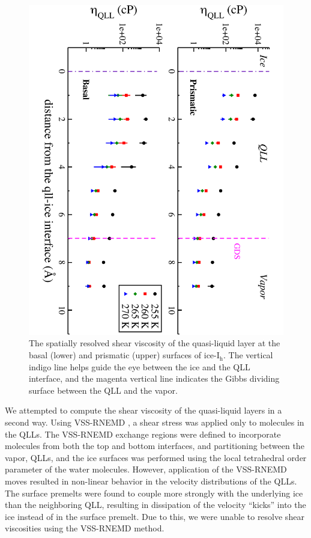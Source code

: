 \begin{figure}
\includegraphics[width=\linewidth]{Figures/qllEta}
\caption{\label{fig:qllEta}The spatially resolved shear viscosity of
  the quasi-liquid layer at the basal (lower) and prismatic (upper)
  surfaces of ice-I$_\mathrm{h}$. The vertical indigo line helps guide
  the eye between the ice and the QLL interface, and the magenta
  vertical line indicates the Gibbs dividing surface between the QLL
  and the vapor.}
\end{figure} 









We attempted to compute the shear viscosity of the quasi-liquid layers
in a second way. Using VSS-RNEMD \cite{Kuang2012}, a shear stress was
applied only to molecules in the QLLs. The VSS-RNEMD exchange regions
were defined to incorporate molecules from both the top and bottom
interfaces, and partitioning between the vapor, QLLs, and the ice
surfaces was performed using the local tetrahedral order parameter of
the water molecules. However, application of the VSS-RNEMD moves
resulted in non-linear behavior in the velocity distributions of the
QLLs. The surface premelts were found to couple more strongly with the
underlying ice than the neighboring QLL, resulting in dissipation of
the velocity ``kicks'' into the ice instead of in the surface
premelt. Due to this, we were unable to resolve shear viscosities
using the VSS-RNEMD method.



